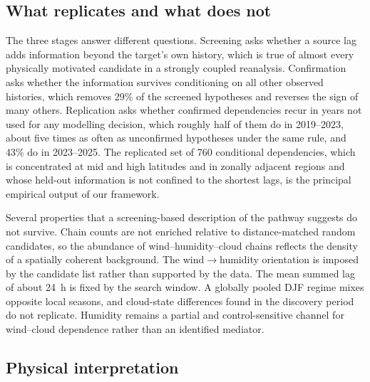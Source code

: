 \documentclass[preprint,12pt]{elsarticle}
\begin{document}
\subsection{What replicates and what does not}

The three stages answer different questions. Screening asks whether a source lag adds information beyond the target's own history, which is true of almost every physically motivated candidate in a strongly coupled reanalysis. Confirmation asks whether the information survives conditioning on all other observed histories, which removes 29\% of the screened hypotheses and reverses the sign of many others. Replication asks whether confirmed dependencies recur in years not used for any modelling decision, which roughly half of them do in 2019--2023, about five times as often as unconfirmed hypotheses under the same rule, and 43\% do in 2023--2025. The replicated set of 760 conditional dependencies, which is concentrated at mid and high latitudes and in zonally adjacent regions and whose held-out information is not confined to the shortest lags, is the principal empirical output of our framework.

Several properties that a screening-based description of the pathway suggests do not survive. Chain counts are not enriched relative to distance-matched random candidates, so the abundance of wind--humidity--cloud chains reflects the density of a spatially coherent background. The wind$\rightarrow$humidity orientation is imposed by the candidate list rather than supported by the data. The mean summed lag of about 24~h is fixed by the search window. A globally pooled DJF regime mixes opposite local seasons, and cloud-state differences found in the discovery period do not replicate. Humidity remains a partial and control-sensitive channel for wind--cloud dependence rather than an identified mediator.

\subsection{Physical interpretation}
\end{document}
